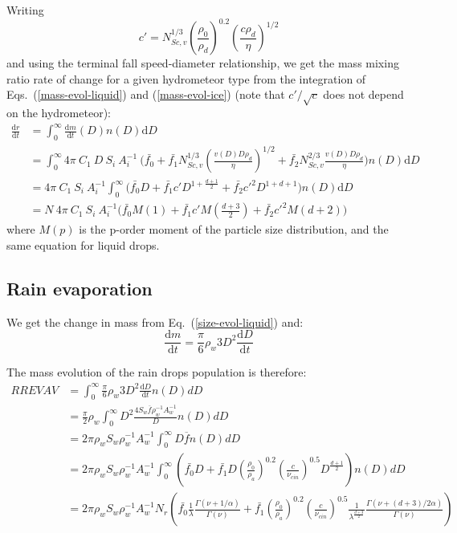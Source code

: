 {Writing
\begin{equation}
 c' = N_{Sc,v}^{1/3} \left(\frac{\rho_0}{\rho_d}\right)^{0.2} \left(\frac{c \rho_d}{\eta}\right)^{1/2} 
\end{equation}
and using the terminal fall speed-diameter relationship, we get the mass mixing ratio rate of change for a given hydrometeor type from the integration of Eqs.\ (\ref{mass-evol-liquid}) and (\ref{mass-evol-ice}) (note that $c'/\sqrt{c}$ does not depend on the hydrometeor):
\begin{align}
 \frac{\mathrm{d}r}{\mathrm{d}t} &= \int_0^\infty \frac{\mathrm{d}m}{\mathrm{d}t}(D) n(D) \mathrm{d}D \\
 &= \int_0^\infty 4\pi ~ C_1 ~ D ~ S_i ~ A_i^{-1} ~ \Bigg(\bar{f_0} + \bar{f_1} N_{Sc,v}^{1/3} \left(\frac{v(D)D\rho_d}{\eta}\right)^{1/2} + \bar{f_2} N_{Sc,v}^{2/3} \frac{v(D)D\rho_d}{\eta} \Bigg) n(D) \mathrm{d}D \\
 &= 4\pi ~ C_1 ~ S_i ~ A_i^{-1} \int_0^\infty \Bigg(\bar{f_0} D + \bar{f_1} c' D^{1+\frac{d+1}{2}} + \bar{f_2} c'^2 D^{1+d+1} \Bigg) n(D) \mathrm{d}D \\
 \label{mixing-ratio-evol}
 &= N ~ 4\pi ~ C_1 ~ S_i ~ A_i^{-1} \Bigg( \bar{f_0} M(1) + \bar{f_1} c' M(\frac{d+3}{2}) + \bar{f_2} c'^2 M(d+2) \Bigg)
\end{align}
where $M(p)$ is the p-order moment of the particle size distribution, and the same equation for liquid drops.

\subsection{Rain evaporation}

We get the change in mass from Eq.\ (\ref{size-evol-liquid}) and:
\begin{equation}
 \frac{\mathrm{d}m}{\mathrm{d}t} = \frac{\pi}{6} \rho_w 3 D^2 \frac{\mathrm{d}D}{\mathrm{d}t}
\end{equation}

The mass evolution of the rain drops population is therefore:
\begin{align}
 RREVAV &= \int_0^\infty \frac{\pi}{6} \rho_w 3 D^2 \frac{\mathrm{d}D}{\mathrm{d}t} n(D) dD \\
 &= \frac{\pi}{2} \rho_w \int_0^\infty D^2 \frac{4 S_w \overline{f} \rho_w^{-1} A_w^{-1}}{D} n(D) dD \\ 
 &= 2 \pi \rho_w S_w \rho_w^{-1} A_w^{-1} \int_0^\infty D \overline{f} n(D) dD \\ 
 &= 2 \pi \rho_w S_w \rho_w^{-1} A_w^{-1} \int_0^\infty \left( \bar{f_0} D + \bar{f_1} D \left(\frac{\rho_0}{\rho_a}\right)^{0.2} \left(\frac{c}{\nu_{cin}}\right)^{0.5} D^{\frac{d+1}{2}}\right) n(D) dD \\ 
 &= 2 \pi \rho_w S_w \rho_w^{-1} A_w^{-1} N_r \left( \bar{f_0} \frac{1}{\lambda} \frac{\Gamma(\nu + 1 / \alpha)}{\Gamma(\nu)}+ \bar{f_1} \left(\frac{\rho_0}{\rho_a}\right)^{0.2} \left(\frac{c}{\nu_{cin}}\right)^{0.5} \frac{1}{\lambda^\frac{d+3}{2}} \frac{\Gamma(\nu + (d+3)/2\alpha)}{\Gamma(\nu)} \right)\\ 
\end{align}

}
